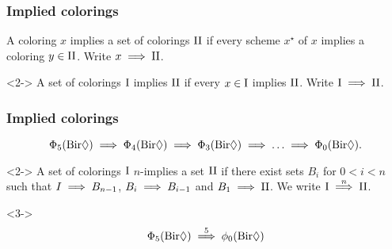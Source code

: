 \begin{frame}
    \frametitle{Implied colorings}

    \begin{definition}
        A coloring $x$ implies a set of colorings $\text{II}$ if every scheme $x^\star$ of $x$ implies a coloring $y \in \text{II}$. Write $x \implies \text{II}$.
    \end{definition}
    
    \begin{definition}<2->
        A set of colorings $\text{I}$ implies $\text{II}$ if every $x \in \text{I}$ implies $\text{II}$. Write $\text{I} \implies \text{II}$.
    \end{definition}

\end{frame}

\begin{frame}
    \frametitle{Implied colorings}
    \begin{equation}
        \Phi_5(\text{Bir}\Diamond) \implies \Phi_4(\text{Bir}\Diamond) \implies \Phi_3(\text{Bir}\Diamond) \implies \ldots \implies \Phi_0(\text{Bir}\Diamond).
    \end{equation}
    \begin{definition}<2->
        A set of colorings $\text{I}$ $n$-implies a set $\text{II}$ if there exist sets $B_i$ for $0 < i < n$ such that $I \implies B_{n-1}$, $B_i \implies B_{i-1}$ and $B_1 \implies \text{II}$. We write $\text{I} \stackrel{n}{\implies} \text{II}$.
    \end{definition}

    \begin{example}<3->
        \begin{equation}
            \Phi_5(\text{Bir}\Diamond) \stackrel{5}{\implies} \phi_0(\text{Bir}\Diamond)
        \end{equation}
    \end{example}

\end{frame}

